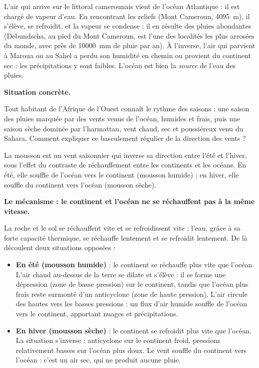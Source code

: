 \documentclass[11pt]{article}
\newcommand{\cle}[1]{{\popxbold\color{popdark}#1}}
\newcounter{popsec}
\newcounter{popsub}
\newcommand{\courssub}[1]{%
  \stepcounter{popsub}%
  \par\vspace{9pt}\noindent{\popxbold\fontsize{11.5}{13}\selectfont\color{popink}{\color{poporange}\thepopsec.\thepopsub}\hspace{6pt}#1}\par\nopagebreak\vspace{4pt}
}
\begin{document}
\begin{exemplebox}
L'air qui arrive sur le littoral camerounais vient de l'océan Atlantique : il est chargé de vapeur d'eau. En rencontrant les reliefs (Mont Cameroun, \SI{4095}{m}), il s'élève, se refroidit, et la vapeur se condense : il en résulte des pluies abondantes (Debundscha, au pied du Mont Cameroun, est l'une des localités les plus arrosées du monde, avec près de \SI{10000}{mm} de pluie par an). À l'inverse, l'air qui parvient à Maroua ou au Sahel a perdu son humidité en chemin ou provient du continent sec : les précipitations y sont faibles. L'océan est bien la \emph{source} de l'eau des pluies.
\end{exemplebox}

\courssub{La mousson : un basculement saisonnier des vents}

\textbf{Situation concrète.}\par
Tout habitant de l'Afrique de l'Ouest connaît le rythme des saisons : une saison des pluies marquée par des vents venus de l'océan, humides et frais, puis une saison sèche dominée par l'\cle{harmattan}, vent chaud, sec et poussiéreux venu du Sahara. Comment expliquer ce basculement régulier de la direction des vents ?

\begin{definition}[La mousson]
La \cle{mousson} est un \cle{vent saisonnier} qui \cle{inverse sa direction} entre l'été et l'hiver, sous l'effet du \cle{contraste de réchauffement} entre les continents et les océans. En été, elle souffle de l'océan vers le continent (mousson humide) ; en hiver, elle souffle du continent vers l'océan (mousson sèche).
\end{definition}

\textbf{Le mécanisme : le continent et l'océan ne se réchauffent pas à la même vitesse.}\par
La roche et le sol se réchauffent vite et se refroidissent vite ; l'eau, grâce à sa forte capacité thermique, se réchauffe lentement et se refroidit lentement. De là découlent deux situations opposées :

\begin{itemize}
\item \textbf{En été (mousson humide)} : le continent se réchauffe plus vite que l'océan. L'air chaud au-dessus de la terre se dilate et s'élève : il se forme une \cle{dépression} (zone de basse pression) sur le continent, tandis que l'océan plus frais reste surmonté d'un \cle{anticyclone} (zone de haute pression). L'air circule des hautes vers les basses pressions : un flux d'air \cle{humide} souffle de l'océan vers le continent, apportant nuages et \cle{précipitations}.
\item \textbf{En hiver (mousson sèche)} : le continent se refroidit plus vite que l'océan. La situation s'inverse : anticyclone sur le continent froid, pressions relativement basses sur l'océan plus doux. Le vent souffle du continent vers l'océan : c'est un air \cle{sec}, qui ne produit aucune pluie.
\end{itemize}
\end{document}
